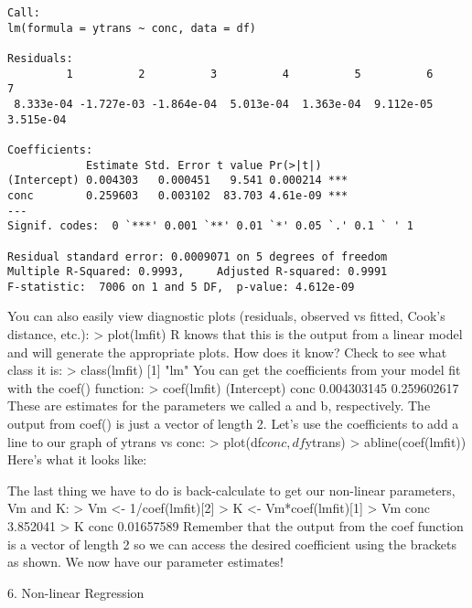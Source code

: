 {\begin{framed}
\begin{verbatim}
Call:
lm(formula = ytrans ~ conc, data = df)

Residuals:
         1          2          3          4          5          6          7 
 8.333e-04 -1.727e-03 -1.864e-04  5.013e-04  1.363e-04  9.112e-05  3.515e-04 

Coefficients:
            Estimate Std. Error t value Pr(>|t|)    
(Intercept) 0.004303   0.000451   9.541 0.000214 ***
conc        0.259603   0.003102  83.703 4.61e-09 ***
---
Signif. codes:  0 `***' 0.001 `**' 0.01 `*' 0.05 `.' 0.1 ` ' 1 

Residual standard error: 0.0009071 on 5 degrees of freedom
Multiple R-Squared: 0.9993,     Adjusted R-squared: 0.9991 
F-statistic:  7006 on 1 and 5 DF,  p-value: 4.612e-09 
\end{verbatim}
\end{framed}
You can also easily view diagnostic plots (residuals, observed vs fitted, Cook's distance, etc.): 
> plot(lmfit)
R knows that this is the output from a linear model and will generate the appropriate plots. How does it know? Check to see what class it is: 
> class(lmfit)
[1] "lm"
You can get the coefficients from your model fit with the coef() function: 
> coef(lmfit)
(Intercept)        conc 
0.004303145 0.259602617
These are estimates for the parameters we called a and b, respectively. The output from coef() is just a vector of length 2. Let's use the coefficients to add a line to our graph of ytrans vs conc: 
> plot(df$conc, df$ytrans)
> abline(coef(lmfit))
Here's what it looks like:

The last thing we have to do is back-calculate to get our non-linear parameters, Vm and K: 
> Vm <- 1/coef(lmfit)[2]
> K <- Vm*coef(lmfit)[1]
> Vm
    conc 
3.852041 
> K
      conc 
0.01657589 
Remember that the output from the coef function is a vector of length 2 so we can access the desired coefficient using the brackets as shown. We now have our parameter estimates! 

6. Non-linear Regression


}
